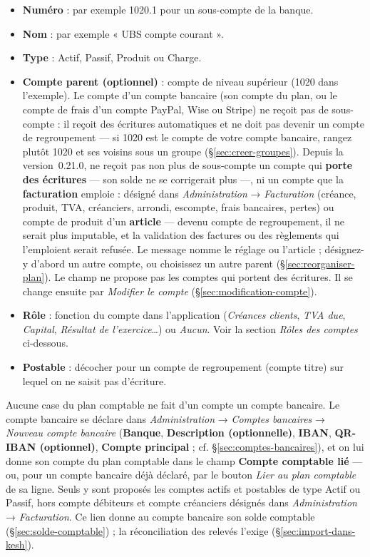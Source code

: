 \documentclass[a4paper,11pt,oneside]{article}
\begin{document}
\begin{itemize}
    \item \textbf{Numéro} : par exemple 1020.1 pour un sous-compte de la banque.
    \item \textbf{Nom} : par exemple « UBS compte courant ».
    \item \textbf{Type} : Actif, Passif, Produit ou Charge.
    \item \textbf{Compte parent (optionnel)} : compte de niveau supérieur (1020 dans l'exemple). Le compte d'un compte bancaire (son compte du plan, ou le compte de frais d'un compte PayPal, Wise ou Stripe) ne reçoit pas de sous-compte : il reçoit des écritures automatiques et ne doit pas devenir un compte de regroupement --- si 1020 est le compte de votre compte bancaire, rangez plutôt 1020 et ses voisins sous un groupe (\S\ref{sec:creer-groupes}). Depuis la version~0.21.0, ne reçoit pas non plus de sous-compte un compte qui \textbf{porte des écritures} --- son solde ne se corrigerait plus ---, ni un compte que la \textbf{facturation} emploie : désigné dans \emph{Administration} → \emph{Facturation} (créance, produit, TVA, créanciers, arrondi, escompte, frais bancaires, pertes) ou compte de produit d'un \textbf{article} --- devenu compte de regroupement, il ne serait plus imputable, et la validation des factures ou des règlements qui l'emploient serait refusée. Le message nomme le réglage ou l'article ; désignez-y d'abord un autre compte, ou choisissez un autre parent (\S\ref{sec:reorganiser-plan}). Le champ ne propose pas les comptes qui portent des écritures. Il se change ensuite par \emph{Modifier le compte} (\S\ref{sec:modification-compte}).
    \item \textbf{Rôle} : fonction du compte dans l'application (\emph{Créances clients}, \emph{TVA due}, \emph{Capital}, \emph{Résultat de l'exercice}\ldots) ou \emph{Aucun}. Voir la section \emph{Rôles des comptes} ci-dessous.
    \item \textbf{Postable} : décocher pour un compte de regroupement (compte titre) sur lequel on ne saisit pas d'écriture.
\end{itemize}

Aucune case du plan comptable ne fait d'un compte un compte bancaire. Le compte bancaire se
déclare dans \emph{Administration} → \emph{Comptes bancaires} → \emph{Nouveau compte bancaire}
(\textbf{Banque}, \textbf{Description (optionnelle)}, \textbf{IBAN}, \textbf{QR-IBAN (optionnel)},
\textbf{Compte principal} ; cf. \S\ref{sec:comptes-bancaires}), et on
lui donne son compte du plan comptable dans le champ \textbf{Compte comptable lié} --- ou, pour un
compte bancaire déjà déclaré, par le bouton \emph{Lier au plan comptable} de sa ligne. Seuls y
sont proposés les comptes actifs et postables de type Actif ou Passif, hors compte débiteurs et
compte créanciers désignés dans \emph{Administration} → \emph{Facturation}. Ce lien donne au compte
bancaire son solde comptable (\S\ref{sec:solde-comptable}) ; la réconciliation des relevés
l'exige (\S\ref{sec:import-dans-kesh}).
\end{document}
